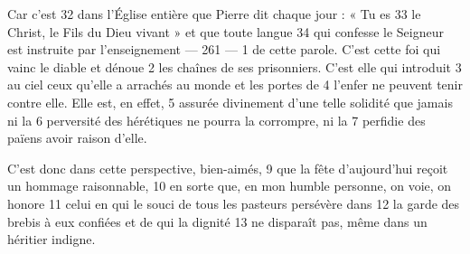 Car c'est	 
32	 	dans l'Église entière que Pierre dit chaque jour : « Tu es	 
33	 	le Christ, le Fils du Dieu vivant » et que toute langue	 
34	 	qui confesse le Seigneur est instruite par l'enseignement	 
 	--- 261 ---	 
1	 	de cette parole. C'est cette foi qui vainc le diable et dénoue	 
2	 	les chaînes de ses prisonniers. C'est elle qui introduit	 
3	 	au ciel ceux qu'elle a arrachés au monde et les portes de	 
4	 	l'enfer ne peuvent tenir contre elle. Elle est, en effet,	 
5	 	assurée divinement d'une telle solidité que jamais ni la	 
6	 	perversité des hérétiques ne pourra la corrompre, ni la	 
7	 	perfidie des païens avoir raison d'elle.

C'est donc dans cette perspective, bien-aimés,	 
9	 	que la fête d'aujourd'hui reçoit un hommage raisonnable,	 
10	 	en sorte que, en mon humble personne, on voie, on honore	 
11	 	celui en qui le souci de tous les pasteurs persévère dans	 
12	 	la garde des brebis à eux confiées et de qui la dignité	 
13	 	ne disparaît pas, même dans un héritier indigne.